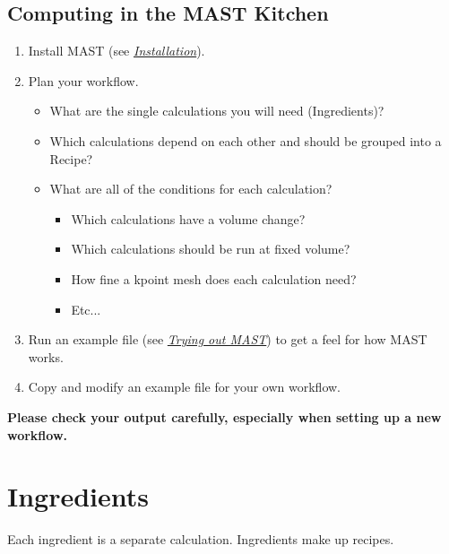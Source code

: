 \documentclass[letterpaper,10pt,english]{sphinxmanual}
\begin{document}
\section{Computing in the MAST Kitchen}
\label{0_0_introduction:computing-in-the-mast-kitchen}\begin{enumerate}
\item {} 
Install MAST (see {\hyperref[1_0_installation::doc]{\emph{Installation}}}).

\item {} 
Plan your workflow.
\begin{itemize}
\item {} 
What are the single calculations you will need (Ingredients)?

\item {} 
Which calculations depend on each other and should be grouped into a Recipe?

\item {} 
What are all of the conditions for each calculation?
\begin{itemize}
\item {} 
Which calculations have a volume change?

\item {} 
Which calculations should be run at fixed volume?

\item {} 
How fine a kpoint mesh does each calculation need?

\item {} 
Etc...

\end{itemize}

\end{itemize}

\item {} 
Run an example file (see {\hyperref[17_0_testmast::doc]{\emph{Trying out MAST}}}) to get a feel for how MAST works.

\item {} 
Copy and modify an example file for your own workflow.

\end{enumerate}

\textbf{Please check your output carefully, especially when setting up a new workflow.}


\chapter{Ingredients}
\label{2_0_ingredients::doc}\label{2_0_ingredients:ingredients}
Each ingredient is a separate calculation. Ingredients make up recipes.
\end{document}
